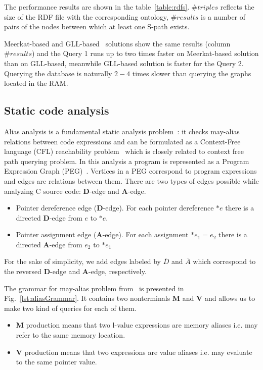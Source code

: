 The performance results are shown in the table~\ref{table:rdfs}. $\#triples$ reflects the size of the RDF file with the corresponding ontology, $\#results$ is a number of pairs of the nodes between which at least one S-path exists. 

Meerkat-based and GLL-based~\cite{GrigorevR16} solutions show the same results (column $\#results$) and the Query 1 runs up to two times faster on Meerkat-based solution than on GLL-based, meanwhile GLL-based solution is faster for the Query 2. Querying the database is naturally $2-4$ times slower than querying the graphs located in the RAM.


\subsection{Static code analysis}

Alias analysis is a fundamental static analysis problem~\cite{Marlowe}: it checks may-alias relations between code expressions and can be formulated as a Context-Free language (CFL) reachability problem~\cite{Reps} which is closely related to context free path querying problem.
In this analysis a program is represented as a Program Expression Graph (PEG)~\cite{Zheng}.
Vertices in a PEG correspond to program expressions and edges are relations between them.
There are two types of edges possible while analyzing C source code: \textbf{D}-edge and \textbf{A}-edge.

\begin{itemize}
    \item Pointer dereference edge (\textbf{D}-edge). For each pointer dereference $*e$ there is a directed \textbf{D}-edge from $e$ to $*e$.
    \item Pointer assignment edge (\textbf{A}-edge). For each assignment $*e_1=e_2$ there is a directed \textbf{A}-edge from $e_2$ to $*e_1$
\end{itemize}

For the sake of simplicity, we add edges labeled by $\overline{D}$ and $\overline{A}$ which correspond to the reversed \textbf{D}-edge and \textbf{A}-edge, respectively.

The grammar for may-alias problem from~\cite{Zheng} is presented in Fig.~\ref{lst:aliasGrammar}.
It contains two nonterminals \textbf{M} and \textbf{V} and allows us to make two kind of queries for each of them.

\begin{itemize}
    \item \textbf{M} production means that two l-value expressions are memory aliases i.e. may refer to the same memory location.
    \item \textbf{V} production means that two expressions are value aliases i.e. may evaluate to the same pointer value.
\end{itemize}

